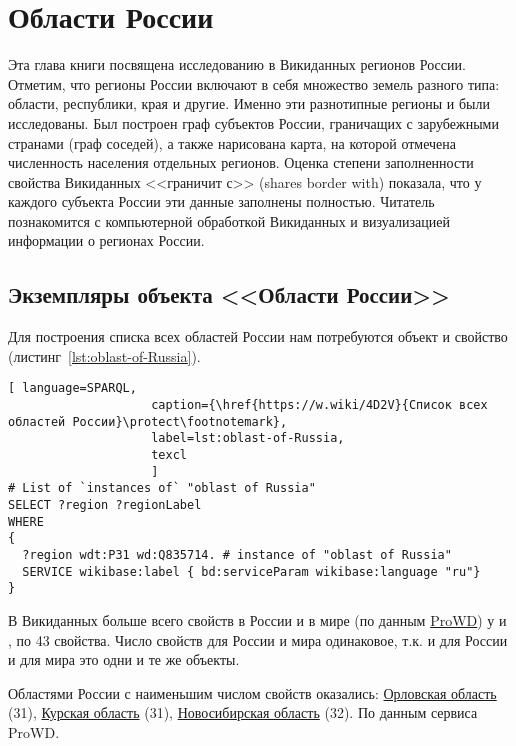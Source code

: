 ﻿\chapter{Области России}
\label{ch:oblast-of-Russia}
Эта глава книги посвящена исследованию в Викиданных регионов России. 
Отметим, что регионы России включают в себя множество земель разного 
типа: области, республики, края и другие. Именно эти разнотипные регионы 
и были исследованы. Был построен граф субъектов России, граничащих 
с зарубежными странами (граф соседей), а также нарисована карта, 
на которой отмечена численность населения отдельных регионов. Оценка 
степени заполненности свойства Викиданных <<граничит с>> (shares border with) 
показала, что у каждого субъекта России эти данные заполнены полностью. 
Читатель познакомится с компьютерной обработкой Викиданных и визуализацией 
информации о регионах России.

\section{Экземпляры объекта <<Области России>>}

Для построения списка всех областей России нам потребуются объект 
 и свойство  
(листинг~\protect\ref{lst:oblast-of-Russia}).

\begin{lstlisting}[ language=SPARQL, 
                    caption={\href{https://w.wiki/4D2V}{Список всех областей России}\protect\footnotemark},
                    label=lst:oblast-of-Russia,
                    texcl 
                    ]
# List of `instances of` "oblast of Russia"
SELECT ?region ?regionLabel
WHERE
{
  ?region wdt:P31 wd:Q835714. # instance of "oblast of Russia"
  SERVICE wikibase:label { bd:serviceParam wikibase:language "ru"}
}
\end{lstlisting}%

В Викиданных больше всего свойств в России и в мире (по данным \href{https://prowd.id/dashboards/68f1cfd5b84d/profile}{ProWD}) у  и , по 43 свойства. Число свойств для России и мира одинаковое, т.к. и для России и для мира это одни и те же объекты.

Областями России с наименьшим числом свойств оказались: \href{http://www.wikidata.org/entity/Q3129}{Орловская область} (31), \href{http://www.wikidata.org/entity/Q3178}{Курская область} (31), \href{http://www.wikidata.org/entity/Q5851}{Новосибирская область} (32). По данным сервиса ProWD\autocite{Russia_prowd}.

